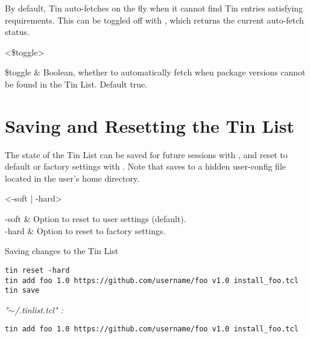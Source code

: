 \documentclass{article}
\begin{document}
By default, Tin auto-fetches on the fly when it cannot find Tin entries satisfying requirements. This can be toggled off with , which returns the current auto-fetch status.

\begin{syntax}
 <\$toggle>
\end{syntax}
\begin{args}
\$toggle & Boolean, whether to automatically fetch when package versions cannot be found in the Tin List. Default true.
\end{args}

\clearpage
\section{Saving and Resetting the Tin List}
The state of the Tin List can be saved for future sessions with , and reset to default or factory settings with . 
Note that  saves to a hidden user-config file located in the user's home directory.
\begin{syntax}
\end{syntax}
\begin{syntax}
 <-soft | -hard>
\end{syntax}
\begin{args}
-soft & Option to reset to user settings (default). \\
-hard & Option to reset to factory settings.
\end{args}

\begin{example}{Saving changes to the Tin List}
\begin{lstlisting}
tin reset -hard
tin add foo 1.0 https://github.com/username/foo v1.0 install_foo.tcl
tin save
\end{lstlisting}
\tcblower

\textit{"$\sim$/.tinlist.tcl" :}
\begin{lstlisting}
tin add foo 1.0 https://github.com/username/foo v1.0 install_foo.tcl
\end{lstlisting}
\end{example}


\clearpage
\end{document}
